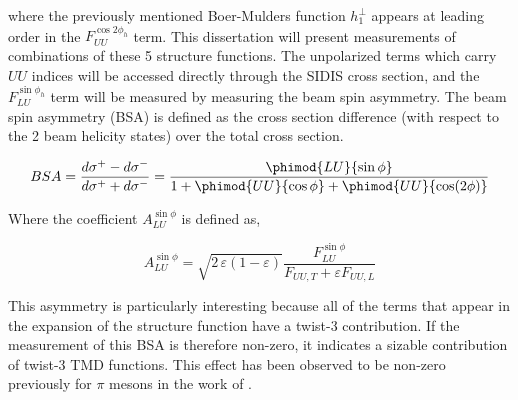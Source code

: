 where the previously mentioned Boer-Mulders function $h_{1}^{\perp}$ appears at leading order in the $F_{UU}^{\cos 2\phi_h}$ term.  This dissertation will present measurements of combinations of these 5 structure functions.  The unpolarized terms which carry $UU$ indices will be accessed directly through the SIDIS cross section, and the $F_{LU}^{\sin\phi_h}$ term will be measured by measuring the beam spin asymmetry.  The beam spin asymmetry (BSA) is defined as the cross section difference (with respect to the 2 beam helicity states) over the total cross section.

\begin{equation}
  BSA = \frac{d\sigma^+ - d\sigma^-}{d\sigma^+ + d\sigma^-} = \frac{\phimod{LU}{\sin\phi}}{1 + \phimod{UU}{\cos\phi} + \phimod{UU}{\cos(2\phi)}}
\end{equation}

Where the coefficient $A_{LU}^{\sin\phi}$ is defined as, 

\begin{equation}
  A_{LU}^{\sin\phi} = \sqrt{2\,\varepsilon (1-\varepsilon)} \frac{F_{LU}^{\sin\phi}}{F_{UU,T} + \varepsilon F_{UU,L}}
\end{equation}

This asymmetry is particularly interesting because all of the terms that appear in the expansion of the structure function have a twist-3 contribution.  If the measurement of this BSA is therefore non-zero, it indicates a sizable contribution of twist-3 TMD functions.  This effect has been observed to be non-zero previously for $\pi$ mesons in the work of \cite{pion-bsa-gohn}.  

